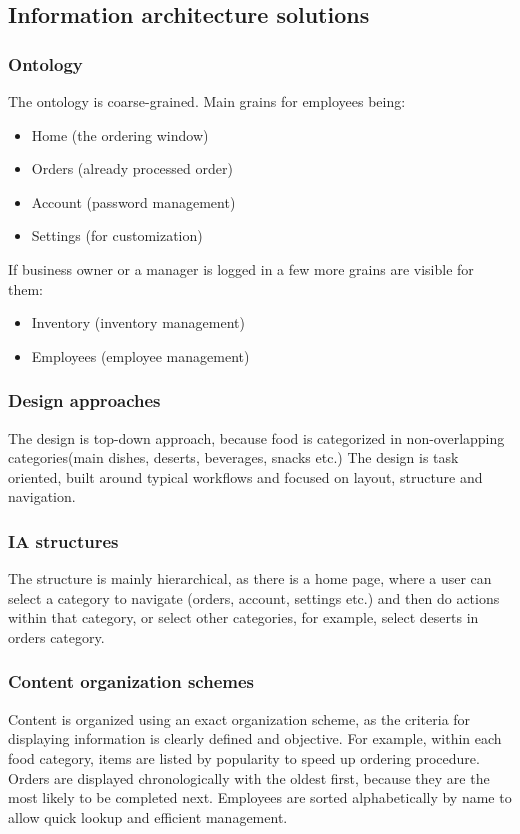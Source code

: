 \documentclass{article}
\begin{document}
\subsection{Information architecture solutions}
\subsubsection{Ontology}
The ontology is coarse-grained. Main grains for employees being: 
\begin{itemize}
    \item Home (the ordering window)
    \item Orders (already processed order)
    \item Account (password management)
    \item Settings (for customization)
\end{itemize}
If business owner or a manager is logged in a few more grains are visible for them: 
\begin{itemize}
    \item Inventory (inventory management)
    \item Employees (employee management)
\end{itemize}
\subsubsection{Design approaches}
The design is top-down approach, because food is categorized in non-overlapping categories(main dishes, deserts, beverages, snacks etc.) The design is task oriented, built around typical workflows and focused on layout, structure and navigation.
\subsubsection{IA structures} %
The structure is mainly hierarchical, as there is a home page, where a user can select a category to navigate (orders, account, settings etc.) and then do actions within that category, or select other categories, for example, select deserts in orders category.
\subsubsection{Content organization schemes} %
Content is organized using an exact organization scheme, as the criteria for displaying information is clearly defined and objective. For example, within each food category, items are listed by popularity to speed up ordering procedure. Orders are displayed chronologically with the oldest first, because they are the most likely to be completed next. %
Employees are sorted alphabetically by name to allow quick lookup and efficient management. 
\end{document}
